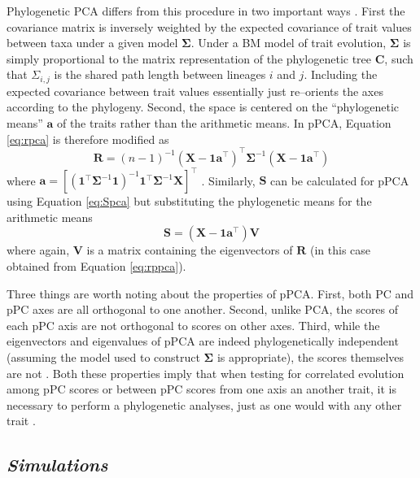 \documentclass[a4paper,12pt]{article}
\begin{document}
Phylogenetic PCA differs from this procedure in two important ways \citep{Revell2008,Polly2013} . First the covariance matrix is inversely weighted by the expected covariance of trait values between taxa under a given model $\mathbf{\Sigma}$. Under a BM model of trait evolution, $\mathbf{\Sigma}$ is simply proportional to the matrix representation of the phylogenetic tree $\mathbf{C}$, such that $\Sigma_{i,j}$ is the shared path length between lineages $i$ and $j$. Including the expected covariance between trait values essentially just re--orients the axes according to the phylogeny. Second, the space is centered on the ``phylogenetic means'' $\mathbf{a}$ of the traits rather than the arithmetic means. In pPCA, Equation \ref{eq:rpca} is therefore modified as
\begin{equation}\label{eq:rppca}
\mathbf{R} = (n-1)^{-1}(\mathbf{X} - \mathbf{1a}^\intercal)^\intercal \mathbf{\Sigma}^{-1} (\mathbf{X} - \mathbf{1a}^\intercal)
\end{equation}
where $\mathbf{a}=[(\mathbf{1}^\intercal \mathbf{\Sigma}^{-1} \mathbf{1})^{-1} 
\mathbf{1}^\intercal \mathbf{\Sigma}^{-1} \mathbf{X}]^\intercal$ \citep{RevellHarmon2008,Revell2008}. Similarly, $\mathbf{S}$ can be calculated for pPCA using Equation \ref{eq:Spca} but substituting the phylogenetic means for the arithmetic means
\begin{equation}\label{eq:Sppca}
\mathbf{S}=(\mathbf{X} - \mathbf{1a}^\intercal)\mathbf{V}
\end{equation}
where again, $\mathbf{V}$ is a matrix containing the eigenvectors of $\mathbf{R}$ (in this case obtained from Equation \ref{eq:rppca}).

Three things are worth noting about the properties of pPCA. First, both PC and pPC axes are all orthogonal to one another. Second, unlike PCA, the scores of each pPC axis are not orthogonal to scores on other axes. Third, while the eigenvectors and eigenvalues of pPCA are indeed phylogenetically independent (assuming the model used to construct $\mathbf{\Sigma}$ is appropriate), the scores themselves are not \citep{Revell2008, Polly2013}. Both these properties imply that when testing for correlated evolution among pPC scores or between pPC scores from one axis an another trait, it is necessary to perform a phylogenetic analyses, just as one would with any other trait \citep{Revell2008, Polly2013}.


\subsection{\emph{Simulations}}
\end{document}
